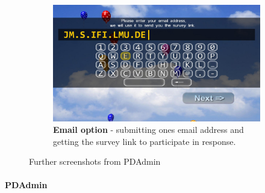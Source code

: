 \begin{figure}
\begin{subfigure}[b]{0.7\textwidth}
            \centering
    \includegraphics[width=\columnwidth]{img/screenshots/balloon-game/option-email.jpg}
            \caption{\textbf{Email option} - submitting ones email address and getting the survey link to participate in response.}
            \label{screenshot:email-option}
        \end{subfigure}
        \caption{Further screenshots from PDAdmin}
    \end{figure}




\clearpage

\paragraph{PDAdmin}


